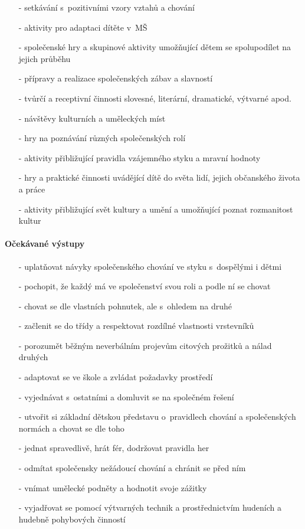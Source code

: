 					\begin{itemize}
					\setlength\itemsep{-2mm}
						\item[-]setkávání s~pozitivními vzory vztahů a chování
						\item[-]aktivity pro adaptaci dítěte v~MŠ
						\item[-]společenské hry a skupinové aktivity umožňující dětem se spolupodílet na jejich průběhu
						\item[-]přípravy a realizace společenských zábav a slavností
						\item[-]tvůrčí a receptivní činnosti slovesné, literární, dramatické, výtvarné apod.
						\item[-]návštěvy kulturních a uměleckých míst
						\item[-]hry na poznávání různých společenských rolí
						\item[-]aktivity přibližující pravidla vzájemného styku a mravní hodnoty
						\item[-]hry a praktické činnosti uvádějící dítě do světa lidí, jejich občanského života a práce
						\item[-]aktivity přibližující svět kultury a umění a umožňující poznat rozmanitost kultur
					\end{itemize}
					
					\paragraph{Očekávané výstupy}

					\begin{itemize}
					\setlength\itemsep{-2mm}
						\item[-]uplatňovat návyky společenského chování ve styku s~dospělými i dětmi
						\item[-]pochopit, že každý má ve společenství svou roli a podle ní se chovat
						\item[-]chovat se dle vlastních pohnutek, ale s~ohledem na druhé
						\item[-]začlenit se do třídy a respektovat rozdílné vlastnosti vrstevníků
						\item[-]porozumět běžným neverbálním projevům citových prožitků a nálad druhých
						\item[-]adaptovat se ve škole a zvládat požadavky prostředí
						\item[-]vyjednávat s~ostatními a domluvit se na společném řešení
						\item[-]utvořit si základní dětskou představu o~pravidlech chování a společenských normách a chovat se dle toho
						\item[-]jednat spravedlivě, hrát fér, dodržovat pravidla her 
						\item[-]odmítat společensky nežádoucí chování a chránit se před ním
						\item[-]vnímat umělecké podněty a hodnotit svoje zážitky
						\item[-]vyjadřovat se pomocí výtvarných technik a prostřednictvím hudeních a hudebně pohybových činností
					\end{itemize}

